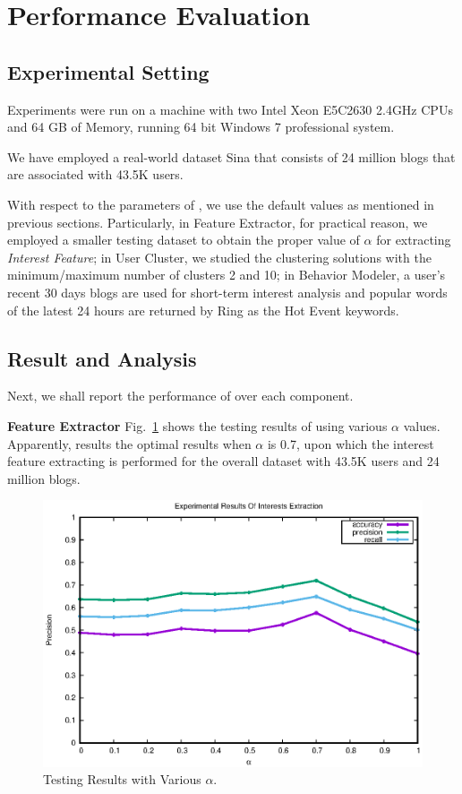 \section{Performance Evaluation}
\label{sec:perf}

\subsection{Experimental Setting}

Experiments were run on a machine with two Intel Xeon E5C2630 2.4GHz CPUs and 64 GB of Memory, running 64 bit Windows 7 professional system.

We have employed a real-world dataset Sina that consists of 24 million blogs that are associated with 43.5K users.

With respect to the parameters of \sys{}, we use the default values as mentioned in previous sections.
Particularly, in Feature Extractor, for practical reason, we employed a smaller testing dataset to obtain the proper value of $\alpha$ for extracting \textit{Interest Feature};
in User Cluster, we studied the clustering solutions with the minimum/maximum number of clusters 2 and 10;
in Behavior Modeler, a user's recent 30 days blogs are used for short-term interest analysis and popular words of the latest 24 hours are returned by Ring as the Hot Event keywords.

\subsection{Result and Analysis}
Next, we shall report the performance of \sys{} over each component.

\textbf{Feature Extractor}
%
Fig.\ \ref{fig:fe} shows the testing results of using various $\alpha$ values.
Apparently, \sys{} results the optimal results when $\alpha$ is 0.7, upon which the interest feature extracting is performed for the overall dataset with 43.5K users and 24 million blogs.

\begin{figure}[!htb]
\centering
\includegraphics[width=.7\linewidth]{figures/Interests}
\caption{Testing Results with Various $\alpha$.}
\label{fig:fe}
\end{figure}


